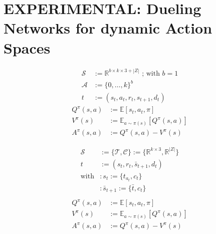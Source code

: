 \documentclass[]{article}
\begin{document}
\section{EXPERIMENTAL: Dueling Networks for dynamic Action Spaces}
\begin{minipage}{0.49\linewidth}
	\begin{align*}
		\mathcal{S} &:= \mathbb{R}^{b \times k \times 3+|Z|} \text{ ; with } b=1 \\
		\mathcal{A} &:= \{ 0, \ldots, k \}^b \\
		t &:= (s_t, a_t, r_t, s_{t+1}, d_t)
	\end{align*}
	\begin{align*}
		Q^\pi(s, a) &:= \mathbb{E}[s_t, a_t, \pi] \\
		V^\pi(s) &:= \mathbb{E}_{a \sim \pi(s)}[Q^\pi(s, a)] \\
		A^\pi(s, a) &:= Q^\pi(s, a) - V^\pi(s)
	\end{align*}
\end{minipage}
\begin{minipage}{0.49\linewidth}
	\begin{align*}
		\mathcal{S} &:= \{ \mathcal{T}, \mathcal{C} \}:= \{ \mathbb{R}^{k \times 3}, \mathbb{R}^{|Z|} \}  \\
		t &:= (s_t, r_t, \bar{s}_{t+1}, d_t) \\
		\text{with} &: s_t := \{ t_{a_t}, c_t \} \\
		 &: \bar{s}_{t+1} := \{ \bar{t}, c_t \} \\
	\end{align*}
	\begin{align*}
		Q^\pi(s, a) &:= \mathbb{E}[s_t, a_t, \pi] \\
		V^\pi(s) &:= \mathbb{E}_{a \sim \pi(s)}[Q^\pi(s, a)] \\
		A^\pi(s, a) &:= Q^\pi(s, a) - V^\pi(s)
	\end{align*}
\end{minipage}




 
\end{document}
